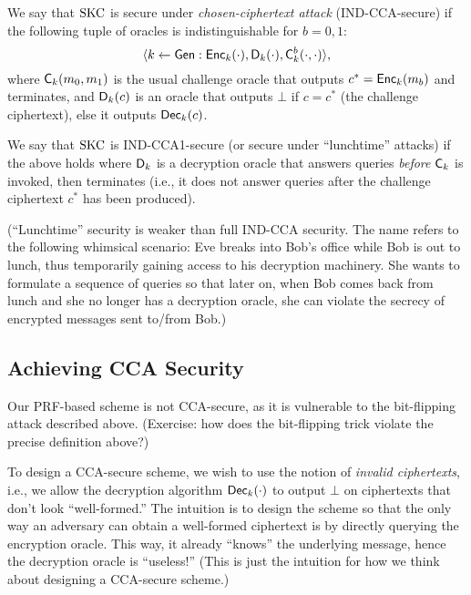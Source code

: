 \documentclass[11pt]{article}
\begin{document}
\begin{definition}
  \label{def:skc-cca}
  We say that $\text{SKC}$ is secure under \emph{chosen-ciphertext attack}
  (IND-CCA-secure) if the following tuple of oracles is
  indistinguishable for $b=0,1$:
  \[ \langle k \gets \mathsf{Gen} : \mathsf{Enc}_{k}(\cdot),
  \mathsf{D}_{k}(\cdot), \mathsf{C}_{k}^{b}(\cdot, \cdot) \rangle, \]
  where $\mathsf{C}_{k}(m_{0},m_{1})$ is the usual challenge oracle that
  outputs $c^{*} = \mathsf{Enc}_{k}(m_{b})$ and terminates, and
  $\mathsf{D}_{k}(c)$ is an oracle that outputs $\bot$ if $c = c^{*}$
  (the challenge ciphertext), else it outputs $\mathsf{Dec}_{k}(c)$.

  We say that $\text{SKC}$ is IND-CCA1-secure (or secure under ``lunchtime''
  attacks) if the above holds where $\mathsf{D}_{k}$ is a decryption
  oracle that answers queries \emph{before} $\mathsf{C}_{k}$ is invoked,
  then terminates (i.e., it does not answer queries after the
  challenge ciphertext $c^{*}$ has been produced).
\end{definition}

(``Lunchtime'' security is weaker than full IND-CCA security.  The
name refers to the following whimsical scenario: Eve breaks into Bob's
office while Bob is out to lunch, thus temporarily gaining access to
his decryption machinery.  She wants to formulate a sequence of
queries so that later on, when Bob comes back from lunch and she no
longer has a decryption oracle, she can violate the secrecy of
encrypted messages sent to/from Bob.)

\subsection{Achieving CCA Security}
\label{sec:achi-cca-secur}

Our PRF-based scheme is not CCA-secure, as it is vulnerable to the
bit-flipping attack described above.  (Exercise: how does the
bit-flipping trick violate the precise definition above?)

To design a CCA-secure scheme, we wish to use the notion of
\emph{invalid ciphertexts}, i.e., we allow the decryption algorithm
$\mathsf{Dec}_{k}(\cdot)$ to output $\bot$ on ciphertexts that don't look
``well-formed.''  The intuition is to design the scheme so that the
only way an adversary can obtain a well-formed ciphertext is by
directly querying the encryption oracle.  This way, it already
``knows'' the underlying message, hence the decryption oracle is
``useless!''  (This is just the intuition for how we think about
designing a CCA-secure scheme.)
\end{document}
